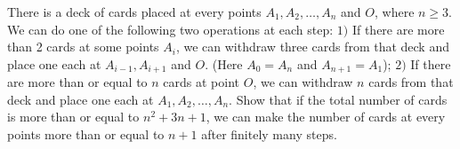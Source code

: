 \begin{problem}
    There is a deck of cards placed at every points $A_1, A_2, \ldots , A_n$ and $O$, where $n \geq 3$. We can do one of the following two operations at each step:
$1)$ If there are more than 2 cards at some points $A_i$, we can withdraw three cards from that deck and place one each at $A_{i-1}, A_{i+1}$ and $O$. (Here $A_0=A_n$ and $A_{n+1}=A_1$);
$2)$ If there are more than or equal to $n$ cards at point $O$, we can withdraw $n$ cards from that deck and place one each at $A_1, A_2, \ldots , A_n$.
Show that if the total number of cards is more than or equal to $n^2+3n+1$, we can make the number of cards at every points more than or equal to $n+1$ after finitely many steps.

\label{10CHN5}
\end{problem}